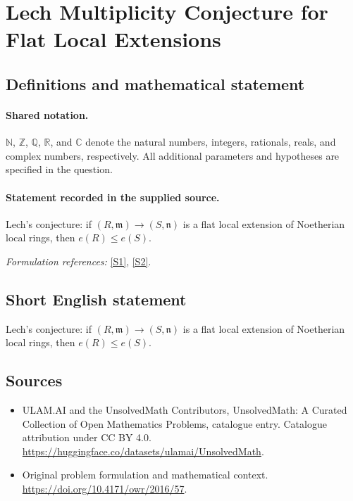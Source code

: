 \documentclass[11pt]{article}
\newcommand{\sref}[2]{\hyperlink{source:#1:#2}{[S#2]}}
\begin{document}
\section{Lech Multiplicity Conjecture for Flat Local Extensions}\label{statement}

\subsection{Definitions and mathematical statement}

\paragraph{Shared notation.}$\mathbb N$, $\mathbb Z$, $\mathbb Q$, $\mathbb R$, and $\mathbb C$ denote the natural numbers, integers, rationals, reals, and complex numbers, respectively. All additional parameters and hypotheses are specified in the question.


\paragraph{Statement recorded in the supplied source.}
Lech's conjecture: if $(R,\mathfrak m)\to(S,\mathfrak n)$ is a flat local extension of Noetherian local rings, then $e(R)\leq e(S)$.
\par\smallskip\textit{Formulation references:} \sref{statement}{1}, \sref{statement}{2}.
\subsection{Short English statement}
Lech's conjecture: if $(R,\mathfrak m)\to(S,\mathfrak n)$ is a flat local extension of Noetherian local rings, then $e(R)\leq e(S)$.
\subsection{Sources}
\begin{itemize}
\item[\hypertarget{source:statement:1}{S1}] ULAM.AI and the UnsolvedMath Contributors, UnsolvedMath: A Curated Collection of Open Mathematics Problems, catalogue entry. Catalogue attribution under CC BY 4.0.
\url{https://huggingface.co/datasets/ulamai/UnsolvedMath}.
\item[\hypertarget{source:statement:2}{S2}] Original problem formulation and mathematical context.
\url{https://doi.org/10.4171/owr/2016/57}.
\end{itemize}
\label{end:statement}
\end{document}
